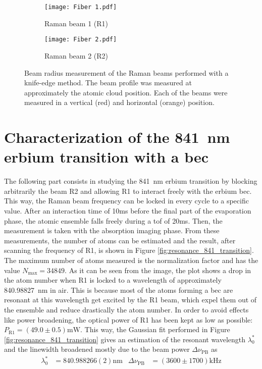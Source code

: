 \pagebreak

\begin{figure}
	\centering
	\begin{subfigure}{.5\textwidth}
		\centering
		\texttt{[image: Fiber 1.pdf]}
		\caption{Raman beam 1 (R1)}
		\label{fig:raman_beams_radius_1}
	\end{subfigure}%
	\begin{subfigure}{.5\textwidth}
		\centering
		\texttt{[image: Fiber 2.pdf]}
		\caption{Raman beam 2 (R2)}
		\label{fig:raman_beams_radius_2}
	\end{subfigure}
	\caption[Beam radius measurement of the Raman beams performed with a knife-edge method]{Beam radius measurement of the Raman beams performed with a knife-edge method. The beam profile was measured at approximately the atomic cloud position. Each of the beams were measured in a vertical (red) and horizontal (orange) position.}
	\label{fig:raman_beams_radius}
\end{figure}


\section{Characterization of the \SI{841}{\nano\meter} erbium transition with a \ac{bec}}

The following part consists in studying the \SI{841}{\nano\meter} erbium transition by blocking arbitrarily the beam R2 and allowing R1 to interact freely with the erbium \ac{bec}. This way, the Raman beam frequency can be locked in every cycle to a specific value. After an interaction time of 10\si{\milli\second} before the final part of the evaporation phase, the atomic ensemble falls freely during a \ac{tof} of 20\si{\milli\second}. Then, the measurement is taken with the absorption imaging phase. From these measurements, the number of atoms can be estimated and the result, after scanning the frequency of R1, is shown in Figure \ref{fig:resonance_841_transition}. The maximum number of atoms measured is the normalization factor and has the value $N_\text{max} = 34849$. As it can be seen from the image, the plot shows a drop in the atom number when R1 is locked to a wavelength of approximately \SI{840.98827}{\nano\meter} in air. This is because most of the atoms forming a \ac{bec} are resonant at this wavelength get excited by the R1 beam, which expel them out of the ensemble and reduce drastically the atom number. In order to avoid effects like power broadening, the optical power of R1 has been kept as low as possible: $P_{\text{R1}} = (49.0 \pm 0.5) \si{\milli\watt}$. This way, the Gaussian fit performed in Figure \ref{fig:resonance_841_transition} gives an estimation of the resonant wavelength $\lambda_0^*$ and the linewidth broadened mostly due to the beam power $\Delta\nu_{\text{PB}}$ as
\begin{align*}
	\lambda_0^* &= 840.988266(2)\si{\nano\meter}   &   \Delta\nu_{\text{PB}} &= (3600 \pm 1700)\si{\kilo\hertz}
\end{align*}

